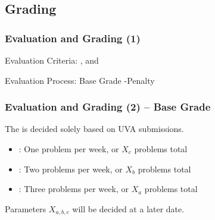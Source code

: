 \documentclass{beamer}
\begin{document}
\subsection{Grading}

\begin{frame}
  \frametitle{Evaluation and Grading (1)}

  Evaluation Criteria: ,  and 
  
  \bigskip

  Evaluation Process: Base Grade  \alert{-Penalty}
\end{frame}

\begin{frame}
  \frametitle{Evaluation and Grading (2) -- Base Grade}

  The  is decided solely based on UVA
  submissions. 

  \bigskip
  
  \begin{itemize}
  \item {}: One problem per week, or $X_c$ problems total

    \medskip

  \item {}: Two problems per week, or $X_b$ problems total

    \medskip

  \item {}: Three problems per week, or $X_a$ problems total
  \end{itemize}

  \bigskip
  
  Parameters $X_{a,b,c}$ will be decided at a later date.

\end{frame}
\end{document}
